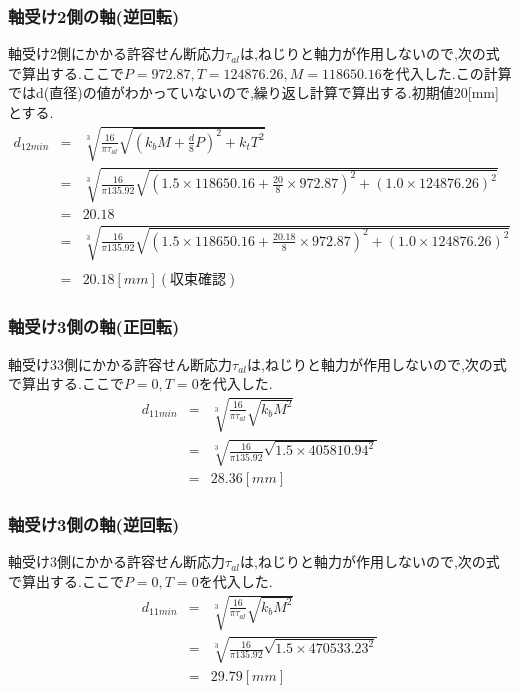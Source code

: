 \documentclass[a4j,twoside,openright,11pt]{jreport}
\begin{document}
\subsubsection{軸受け2側の軸(逆回転)}
軸受け2側にかかる許容せん断応力$\tau_{al}$は,ねじりと軸力が作用しないので,次の式で算出する.ここで$P=972.87,T=124876.26, M=118650.16$を代入した.この計算ではd(直径)の値がわかっていないので,繰り返し計算で算出する.初期値20[mm]とする.
\begin{eqnarray}
d_{12min}&=& \sqrt [3]{ \frac{16}{\pi \tau_{al}}\sqrt{(k_bM+\frac{d}{8}P)^2+k_tT^2} }\\
       &=& \sqrt [3]{ \frac{16}{\pi 135.92} \sqrt{(1.5 \times 118650.16 +\frac{20}{8}\times 972.87)^2+(1.0 \times 124876.26)^2} }\\
       &=&20.18\\
       &=& \sqrt [3]{ \frac{16}{\pi 135.92} \sqrt{(1.5 \times 118650.16 +\frac{20.18}{8}\times 972.87)^2+(1.0 \times 124876.26)^2} }\nonumber\\
\\
       &=&20.18[mm](収束確認)
\end{eqnarray}
\subsubsection{軸受け3側の軸(正回転)}
軸受け33側にかかる許容せん断応力$\tau_{al}$は,ねじりと軸力が作用しないので,次の式で算出する.ここで$P=0,T=0$を代入した.
\begin{eqnarray}
d_{11min} &=& \sqrt [3]{ \frac{16}{\pi \tau_{al}}\sqrt{k_bM^2} }\\
         &=& \sqrt [3]{ \frac{16}{\pi 135.92}\sqrt{1.5 \times 405810.94^2} }\\
         &=& 28.36[mm]
\end{eqnarray}
\subsubsection{軸受け3側の軸(逆回転)}
軸受け3側にかかる許容せん断応力$\tau_{al}$は,ねじりと軸力が作用しないので,次の式で算出する.ここで$P=0,T=0$を代入した.
\begin{eqnarray}
d_{11min} &=& \sqrt [3]{ \frac{16}{\pi \tau_{al}}\sqrt{k_bM^2} }\\
         &=& \sqrt [3]{ \frac{16}{\pi 135.92}\sqrt{1.5 \times 470533.23^2} }\\
         &=& 29.79[mm]
\end{eqnarray}
\end{document}
